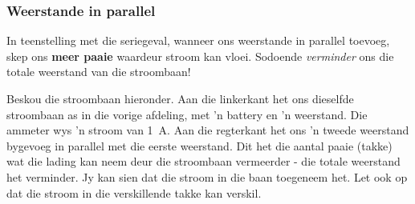 \subsubsection*{Weerstande in parallel}
In teenstelling met die seriegeval, wanneer ons weerstande in parallel toevoeg,
skep ons \textbf{meer paaie} waardeur stroom kan vloei. Sodoende
\textit{verminder} ons die totale weerstand van die stroombaan!

Beskou die stroombaan hieronder. Aan die linkerkant het ons dieselfde
stroombaan as in die vorige afdeling, met  'n battery en  'n weerstand. Die
ammeter wys  'n stroom van 1~A. Aan die regterkant het ons  'n tweede weerstand
bygevoeg in parallel met die eerste weerstand. Dit het die aantal paaie (takke)
wat die lading kan neem deur die stroombaan vermeerder - die totale weerstand
het verminder. Jy kan sien dat die stroom in die baan toegeneem het. Let ook op
dat die stroom in die verskillende takke kan verskil.

